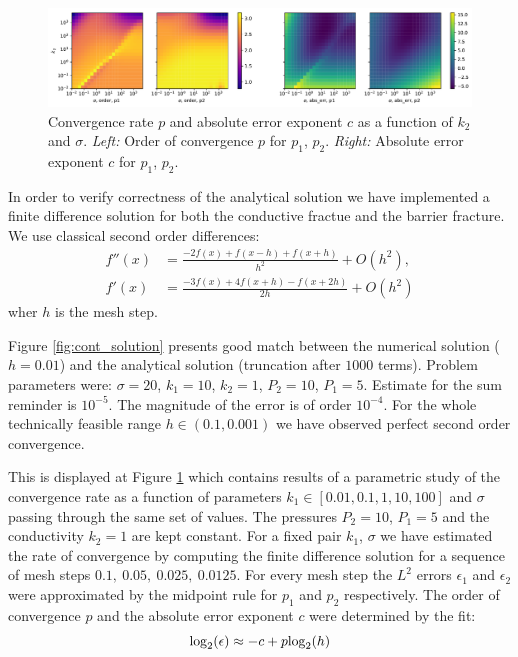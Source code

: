 \documentclass[a4paper,10pt]{article}
\def\log{{\rm log}}
\begin{document}
\begin{figure}
  \label{fig:cont_rate}
  \centering
  \includegraphics[width=\textwidth]{./continuous_conv_rate.pdf}
  \caption{Convergence rate $p$ and absolute error exponent $c$ as a function of $k_2$ and $\sigma$. 
  {\it Left:} Order of convergence $p$ for $p_1$, $p_2$.
  {\it Right:} Absolute error exponent $c$ for $p_1$, $p_2$.}
\end{figure}





In order to verify correctness of the analytical solution we have implemented a finite difference solution for both the conductive fractue 
and the barrier fracture. We use classical second order differences:
\begin{align*}
    f''(x) &= \frac{-2 f(x) + f(x-h) + f(x+h)}{h^2} + O(h^2),\\
    f'(x) &= \frac{-3 f(x) + 4f(x+h) - f(x+2h)}{2h} + O(h^2)
\end{align*}
wher $h$ is the mesh step.

Figure \ref{fig:cont_solution} presents good match between the numerical solution ($h=0.01$) and the analytical solution (truncation after $1000$ terms). 
Problem parameters were: $\sigma=20$, $k_1=10$, $k_2=1$, $P_2=10$, $P_1=5$.
Estimate for the sum reminder is $10^{-5}$. The magnitude of the error is of order $10^{-4}$. For the whole technically feasible range $h\in (0.1, 0.001)$ 
we have observed perfect second order convergence. 

This is displayed at Figure \ref{fig:cont_rate} which contains results of a parametric study of the 
convergence rate as a function of parameters $k_1 \in [0.01, 0.1, 1, 10, 100]$ and $\sigma$ passing through the same set of values. The pressures $P_2=10$, $P_1=5$
and the conductivity $k_2=1$ are kept constant. For a fixed pair $k_1$, $\sigma$ we have estimated the rate of convergence by computing the finite difference solution for a sequence  
of mesh steps $0.1,\ 0.05,\ 0.025,\ 0.0125$. For every mesh step the $L^2$ errors $\epsilon_1$ and $\epsilon_2$ were approximated by the midpoint rule 
for $p_1$ and $p_2$ respectively. The order of convergence $p$ and the absolute error exponent $c$ were determined by the fit:
\[
        \log_2(\epsilon) \approx -c + p\log_2(h) 
\]
\end{document}
